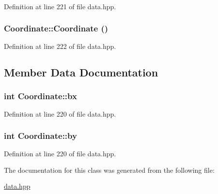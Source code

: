 Definition at line 221 of file data.hpp.\hypertarget{class_coordinate_aac6f323a685fc1e88fbea9c86f1e600d}{
\subsubsection[{Coordinate}]{\setlength{\rightskip}{0pt plus 5cm}Coordinate::Coordinate ()}}
\label{class_coordinate_aac6f323a685fc1e88fbea9c86f1e600d}


Definition at line 222 of file data.hpp.

\subsection{Member Data Documentation}
\hypertarget{class_coordinate_a0c9dfb8c2c3a73068bd02603ef7b3a33}{
\subsubsection[{bx}]{\setlength{\rightskip}{0pt plus 5cm}int {\bf Coordinate::bx}}}
\label{class_coordinate_a0c9dfb8c2c3a73068bd02603ef7b3a33}


Definition at line 220 of file data.hpp.\hypertarget{class_coordinate_a8e844a4d3fe7c4c960152801e9e08472}{
\subsubsection[{by}]{\setlength{\rightskip}{0pt plus 5cm}int {\bf Coordinate::by}}}
\label{class_coordinate_a8e844a4d3fe7c4c960152801e9e08472}


Definition at line 220 of file data.hpp.

The documentation for this class was generated from the following file:\begin{DoxyCompactItemize}
\item 
\hyperlink{data_8hpp}{data.hpp}\end{DoxyCompactItemize}
